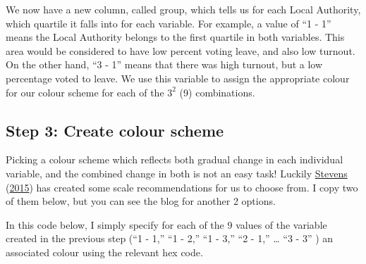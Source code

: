 \documentclass[
]{book}
\begin{document}
We now have a new column, called group, which tells us for each Local Authority, which quartile it falls into for each variable. For example, a value of ``1 - 1'' means the Local Authority belongs to the first quartile in both variables. This area would be considered to have low percent voting leave, and also low turnout. On the other hand, ``3 - 1'' means that there was high turnout, but a low percentage voted to leave. We use this variable to assign the appropriate colour for our colour scheme for each of the \(3^2\) (9) combinations.

\hypertarget{step-3-create-colour-scheme}{%
\subsection{Step 3: Create colour scheme}\label{step-3-create-colour-scheme}}

Picking a colour scheme which reflects both gradual change in each individual variable, and the combined change in both is not an easy task! Luckily \protect\hyperlink{ref-Stevens_2015}{Stevens} (\protect\hyperlink{ref-Stevens_2015}{2015}) has created some scale recommendations for us to choose from. I copy two of them below, but you can see the blog for another 2 options.

In this code below, I simply specify for each of the 9 values of the variable created in the previous step (``1 - 1,'' ``1 - 2,'' ``1 - 3,'' ``2 - 1,'' \ldots{} ``3 - 3'' ) an associated colour using the relevant hex code.
\end{document}
